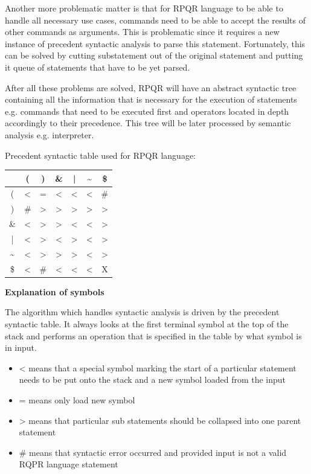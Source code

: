 Another more problematic matter is that for RPQR language to be able to handle all necessary use cases,
commands need to be able to accept the results of other commands as arguments. This is problematic since
it requires a new instance of precedent syntactic analysis to parse this statement. Fortunately, this
can be solved by cutting substatement out of the original statement and putting it queue of statements
that have to be yet parsed.

After all these problems are solved, RPQR will have an abstract syntactic tree containing all the information
that is necessary for the execution of statements e.g. commands that need to be executed first and operators
located in depth accordingly to their precedence. This tree will be later processed by semantic
analysis e.g. interpreter.

\newpage

Precedent syntactic table used for RPQR language:

\begin{center}
  \begin{tabular}{ |c|c|c|c|c|c|c| }
   \hline
     & ( & ) & \& & | & \textasciitilde & \$ \\
     \hline
  (  & < & = & <  & <  & <  & \#  \\
  \hline
  )  & \# & > & >  & >  & >  & >  \\  
  \hline
  \& & < & > & >  & <  & <  & >  \\
  \hline
  |  & < & > & <  & >  & <  & >  \\
  \hline
  \textasciitilde  & < & > & >  & >  & <  & >  \\
  \hline
  \$ & < & \# & <  & <  & <  & X \\
  \hline
  \end{tabular}
\end{center}

\textbf{Explanation of symbols}

The algorithm which handles syntactic analysis is driven by the precedent syntactic table. It always
looks at the first terminal symbol at the top of the stack and performs an operation that is specified
in the table by what symbol is in input.
\begin{itemize}
  \item < means that a special symbol marking the start of a particular statement needs to be put onto the stack and a new symbol loaded from the input
  \item = means only load new symbol
  \item > means that particular sub statements should be collapsed into one parent statement
  \item \# means that syntactic error occurred and provided input is not a valid RQPR language statement
\end{itemize}

